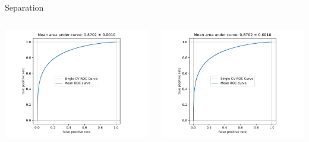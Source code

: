 \begin{frame}[t]{Separation}
\begin{columns}[onlytextwidth]
    \begin{column}{0.475\textwidth}
        \includegraphics[width=\textwidth,page=1]{fig/separation_performance.pdf}
    \end{column}
    \begin{column}{0.475\textwidth}
        \includegraphics[width=\textwidth,page=1]{fig/separation_performance.pdf}
    \end{column}
\end{columns}
\end{frame}

